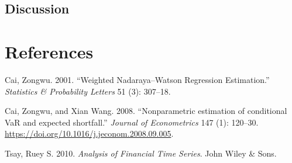 \documentclass[
]{article}
\newlength{\cslhangindent}
\newenvironment{cslreferences}%
  {\setlength{\parindent}{0pt}%
  \everypar{\setlength{\hangindent}{\cslhangindent}}\ignorespaces}%
  {\par}
\theoremstyle{definition}
\theoremstyle{definition}
\theoremstyle{definition}
\theoremstyle{remark}
\begin{document}
\hypertarget{discussion}{%
\subsection{Discussion}\label{discussion}}

\newpage

\hypertarget{references}{%
\section*{References}\label{references}}

\hypertarget{refs}{}
\begin{cslreferences}
\leavevmode\hypertarget{ref-cai2001weighted}{}%
Cai, Zongwu. 2001. ``Weighted Nadaraya--Watson Regression Estimation.'' \emph{Statistics \& Probability Letters} 51 (3): 307--18.

\leavevmode\hypertarget{ref-cai:2008aa}{}%
Cai, Zongwu, and Xian Wang. 2008. ``Nonparametric estimation of conditional VaR and expected shortfall.'' \emph{Journal of Econometrics} 147 (1): 120--30. \url{https://doi.org/10.1016/j.jeconom.2008.09.005}.

\leavevmode\hypertarget{ref-Tsay:2010aa}{}%
Tsay, Ruey S. 2010. \emph{Analysis of Financial Time Series}. John Wiley \& Sons.
\end{cslreferences}
\end{document}
